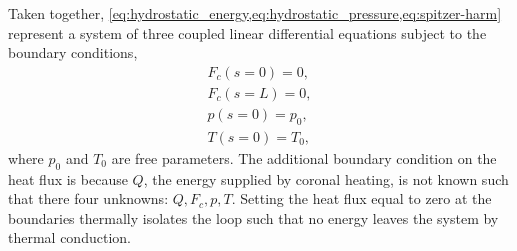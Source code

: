 Taken together, \cref{eq:hydrostatic_energy,eq:hydrostatic_pressure,eq:spitzer-harm} represent a system of three coupled linear differential equations subject to the boundary conditions,
\begin{align}
    F_c(s=0) = 0, \label{eq:hydrostatic:bc1}\\
    F_c(s=L) = 0, \label{eq:hydrostatic:bc2}\\
    p(s=0) = p_0, \\
    T(s=0) = T_0,
\end{align}
where $p_0$ and $T_0$ are free parameters. The additional boundary condition on the heat flux is because $Q$, the energy supplied by coronal heating, is not known such that there four unknowns: $Q,F_c,p,T$. Setting the heat flux equal to zero at the boundaries thermally isolates the loop such that no energy leaves the system by thermal conduction.

